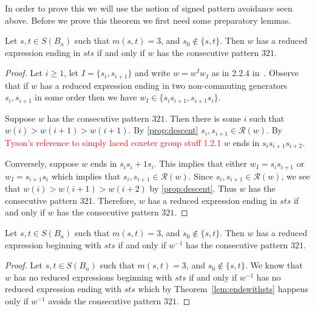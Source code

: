 In order to prove this we will use the notion of signed pattern avoidance seen above. Before we prove this theorem we first need some preparatory lemmas. 

\begin{lemma}\label{lem:sts}
Let $s,t \in S(B_n)$ such that $m(s,t)=3$, and $s_0 \notin \{s,t\}.$ Then $w$ has a reduced expression ending in $sts$ if and only if $w$ has the consecutive pattern $321$.
\begin{proof}
	Let $i \geq 1$, let $I=\{s_i,s_{i+1}\}$ and write $w=w^Iw_I$ as in 2.2.4 in~\cite{Bjorner2005}. Observe that if $w$ has a reduced expression ending in two non-commuting generators $s_i, s_{i+1}$ in some order then we have $w_I \in \{s_is_{i+1}, s_{i+1}s_i\}$.
	
	Suppose $w$ has the consecutive pattern $321$. Then there is some $i$ such that $w(i) > w(i+1) > w(i+1)$. By \ref{prop:descent} $s_i,s_{i+1} \in \mathcal{R}(w)$. By \textcolor{red}{Tyson's reference to simply laced coxeter group stuff 1.2.1} $w$ ends in $s_is_{i+1}s_{i+2}$.
	
	Conversely, suppose $w$ ends in $s_is_i+1s_i$. This implies that either $w_I=s_is_{i+1}$ or $w_I=s_{i+1}s_i$ which implies that $s_i,s_{i+1} \in \mathcal{R}(w)$. Since $s_i,s_{i+1} \in \mathcal{R}(w)$, we see that $w(i)>w(i+1)>w(i+2)$ by \ref{prop:descent}. Thus $w$ has the consecutive pattern 321.
	Therefore, $w$ has a reduced expression ending in $sts$ if and only if $w$ has the consecutive pattern $321$. 
\end{proof}	
\end{lemma}

\begin{corollary}\label{lem:endswithsts}
	Let $s,t \in S(B_n)$ such that $m(s,t)=3$, and $s_0 \notin\{s,t\}$. Then $w$ has a reduced expression beginning with $sts$ if and only if $w^{-1}$ has the consecutive pattern $321$.
	\begin{proof}
		Let $s,t \in S(B_n)$ such that $m(s,t)=3$, and $s_0 \notin\{s,t\}$. We know that $w$ has no reduced expressions beginning with $sts$ if and only if $w^{-1}$ has no reduced expression ending with $sts$ which by Theorem~\ref{lem:endswithsts} happens only if $w^{-1}$ avoids the consecutive pattern $321$.
	\end{proof}
\end{corollary}

